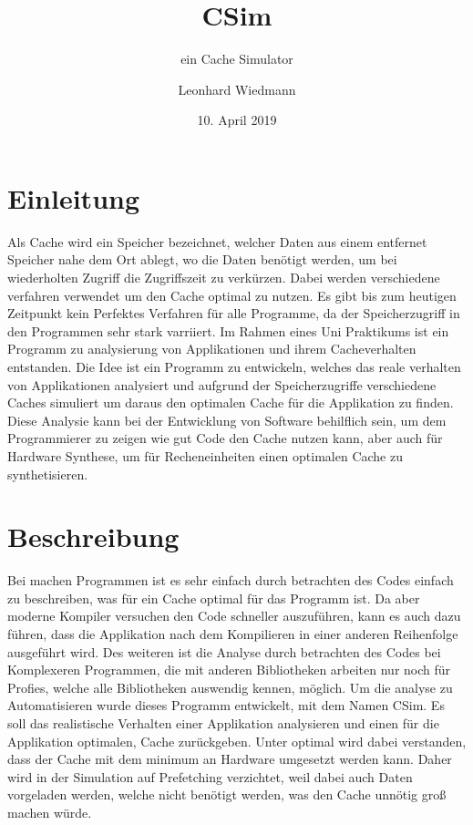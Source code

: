 \documentclass{scrreprt}
\title{CSim}
\subtitle{ein Cache Simulator}
\author{Leonhard Wiedmann}
\date{10. April 2019}
\begin{document}
\maketitle
\tableofcontents
\chapter{Einleitung}

Als Cache wird ein Speicher bezeichnet, welcher Daten aus einem entfernet Speicher nahe dem Ort ablegt, wo die Daten benötigt werden, um bei wiederholten Zugriff die Zugriffszeit zu verkürzen. Dabei werden verschiedene verfahren verwendet um den Cache optimal zu nutzen. Es gibt bis zum heutigen Zeitpunkt kein Perfektes Verfahren für alle Programme, da der Speicherzugriff in den Programmen sehr stark varriiert. \newline
Im Rahmen eines Uni Praktikums ist ein Programm zu analysierung von Applikationen und ihrem Cacheverhalten entstanden. Die Idee ist ein Programm zu entwickeln, welches das reale verhalten von Applikationen analysiert und aufgrund der Speicherzugriffe verschiedene Caches simuliert um daraus den optimalen Cache für die Applikation zu finden. Diese Analysie kann bei der Entwicklung von Software behilflich sein, um dem Programmierer zu zeigen wie gut Code den Cache nutzen kann, aber auch für Hardware Synthese, um für Recheneinheiten einen optimalen Cache zu synthetisieren.

\chapter{Beschreibung}

Bei machen Programmen ist es sehr einfach durch betrachten des Codes einfach zu beschreiben, was für ein Cache optimal für das Programm ist. Da aber moderne Kompiler versuchen den Code schneller auszuführen, kann es auch dazu führen, dass die Applikation nach dem Kompilieren in einer anderen Reihenfolge ausgeführt wird. Des weiteren ist die Analyse durch betrachten des Codes bei Komplexeren Programmen, die mit anderen Bibliotheken arbeiten nur noch für Profies, welche alle Bibliotheken auswendig kennen, möglich. \newline
Um die analyse zu Automatisieren wurde dieses Programm entwickelt, mit dem Namen CSim. Es soll das realistische Verhalten einer Applikation analysieren und einen für die Applikation optimalen, Cache zurückgeben. \newline
Unter optimal wird dabei verstanden, dass der Cache mit dem minimum an Hardware umgesetzt werden kann. Daher wird in der Simulation auf Prefetching verzichtet, weil dabei auch Daten vorgeladen werden, welche nicht benötigt werden, was den Cache unnötig groß machen würde.
\end{document}
